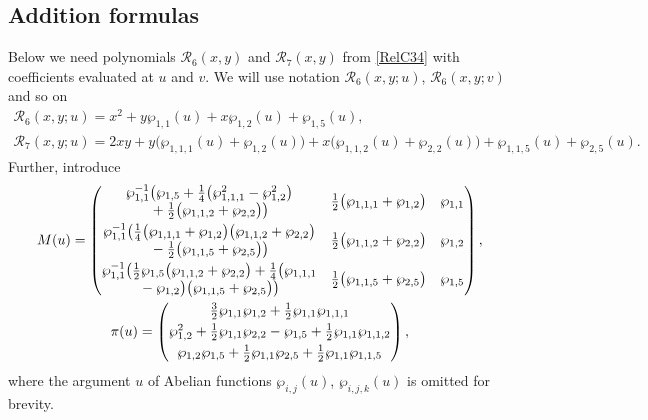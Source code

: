 \documentclass[pdftex]{sigma}
\numberwithin{equation}{section}
\begin{document}
\subsection{Addition formulas}\label{ss:AddF}
Below we need polynomials $\mathcal{R}_6(x,y)$ and $\mathcal{R}_7(x,y)$ from \eqref{RelC34} with coefficients evaluated at $u$ and $v$. We will use notation $\mathcal{R}_6(x,y;u)$, $\mathcal{R}_6(x,y;v)$ and so on
\begin{gather*}
\mathcal{R}_6(x,y;u) = x^2 + y \wp_{1,1}(u) + x \wp_{1,2}(u) + \wp_{1,5}(u),\\
\mathcal{R}_7(x,y;u) = 2 x y + y \big(\wp_{1,1,1}(u) + \wp_{1,2}(u)\big) + x \big(\wp_{1,1,2}(u) + \wp_{2,2}(u)\big) + \wp_{1,1,5}(u) + \wp_{2,5}(u).
\end{gather*}
Further, introduce
\begin{gather*}
M(u) = \begin{pmatrix}
\begin{matrix}\wp_{1,1}^{-1}\big(\wp_{1,5} + \tfrac{1}{4}\big(\wp_{1,1,1}^2- \wp_{1,2}^2 \big) \\
{} + \tfrac{1}{2}\big(\wp_{1,1,2}+\wp_{2,2}\big)\big)\end{matrix} &
 \tfrac{1}{2}\big(\wp_{1,1,1} + \wp_{1,2}\big) & \wp_{1,1} \vspace{1mm}\\
\begin{matrix} \wp_{1,1}^{-1}\big(\tfrac{1}{4}\big(\wp_{1,1,1} + \wp_{1,2} \big)\big(\wp_{1,1,2}+\wp_{2,2}\big)\\
{} - \tfrac{1}{2}\big(\wp_{1,1,5} + \wp_{2,5} \big)\big)\end{matrix} &
 \tfrac{1}{2}\big(\wp_{1,1,2} + \wp_{2,2}\big) & \wp_{1,2} \vspace{1mm}\\
\begin{matrix}\wp_{1,1}^{-1}\big(\tfrac{1}{2} \wp_{1,5} \big(\wp_{1,1,2}+\wp_{2,2}\big) + \tfrac{1}{4}\big(\wp_{1,1,1} \\
{} -\wp_{1,2} \big)\big(\wp_{1,1,5} + \wp_{2,5} \big)\big)\end{matrix}
 & \tfrac{1}{2}\big(\wp_{1,1,5} + \wp_{2,5}\big) & \wp_{1,5}
 \end{pmatrix}, \\
 \pi(u) = \begin{pmatrix}
 \tfrac{3}{2}\wp_{1,1} \wp_{1,2} + \tfrac{1}{2}\wp_{1,1} \wp_{1,1,1} \vspace{1mm}\\
\wp_{1,2}^2 + \tfrac{1}{2}\wp_{1,1} \wp_{2,2}
 - \wp_{1,5} + \tfrac{1}{2}\wp_{1,1}\wp_{1,1,2} \vspace{1mm}\\
\wp_{1,2}\wp_{1,5} + \tfrac{1}{2}\wp_{1,1} \wp_{2,5}
 + \tfrac{1}{2}\wp_{1,1}\wp_{1,1,5} \end{pmatrix},
\end{gather*}
where the argument $u$ of Abelian functions $\wp_{i,j}(u)$, $\wp_{i,j,k}(u)$ is omitted for brevity.
\end{document}
